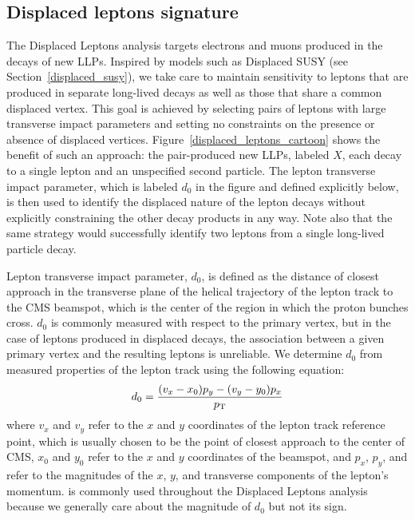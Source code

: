 \subsection{Displaced leptons signature}
The Displaced Leptons analysis targets electrons and muons produced in the decays of new LLPs. Inspired by models such as Displaced SUSY (see Section~\ref{displaced_susy}), we take care to maintain sensitivity to leptons that are produced in separate long-lived decays as well as those that share a common displaced vertex. This goal is achieved by selecting pairs of leptons with large transverse impact parameters and setting no constraints on the presence or absence of displaced vertices. Figure~\ref{displaced_leptons_cartoon} shows the benefit of such an approach: the pair-produced new LLPs, labeled $X$, each decay to a single lepton and an unspecified second particle. The lepton transverse impact parameter, which is labeled $d_0$ in the figure and defined explicitly below, is then used to identify the displaced nature of the lepton decays without explicitly constraining the other decay products in any way. Note also that the same strategy would successfully identify two leptons from a single long-lived particle decay.



Lepton transverse impact parameter, $d_0$, is defined as the distance of closest approach in the transverse plane of the helical trajectory of the lepton track to the CMS beamspot, which is the center of the region in which the proton bunches cross. $d_0$ is commonly measured with respect to the primary vertex, but in the case of leptons produced in displaced decays, the association between a given primary vertex and the resulting leptons is unreliable. We determine $d_0$ from measured properties of the lepton track using the following equation:
\begin{equation}
    d_0 = \frac{(v_x - x_0)p_y - (v_y - y_0)p_x}{p_{\mathrm{T}}}
\end{equation}
where $v_x$ and $v_y$ refer to the $x$ and $y$ coordinates of the lepton track reference point, which is usually chosen to be the point of closest approach to the center of CMS, $x_0$ and $y_0$ refer to the $x$ and $y$ coordinates of the beamspot, and $p_x$, $p_y$, and \pt refer to the magnitudes of the $x$, $y$, and transverse components of the lepton's momentum. \ad is commonly used throughout the Displaced Leptons analysis because we generally care about the magnitude of $d_0$ but not its sign.

